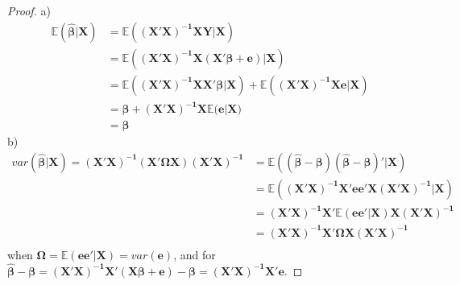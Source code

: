 \documentclass[12pt]{article}
\begin{document}
\begin{proof}
a) 
\begin{align*}
\mathbb{E}(\bm{\hat{\beta}}|\bm{X})
&=\mathbb{E}(\bm{(X'X)^{-1}XY}|\bm{X})\\
&=\mathbb{E}(\bm{(X'X)^{-1}X(X'\beta +e)}|\bm{X})\\
&=\mathbb{E}(\bm{(X'X)^{-1}XX'\beta}|\bm{X})+\mathbb{E}(\bm{(X'X)^{-1}Xe}|\bm{X})\\
&=\bm{\beta}+\bm{(X'X)^{-1}X\mathbb{E}(e}|\bm{X})\\
&=\bm{\beta}
\end{align*}
b)
\begin{align*}
var(\bm{\hat{\beta}}|\bm{X}) = \bm{(X'X)^{-1}(X'\Omega X)(X'X)^{-1}}
&=\mathbb{E}((\hat{\bm{\beta}}-\bm{\beta})(\hat{\bm{\beta}}-\bm{\beta})'|\bm{X})\\
&=\mathbb{E}(\bm{(X'X)^{-1}X'ee'X(X'X)^{-1}}|\bm{X})\\
&=\bm{(X'X)^{-1}X'}\mathbb{E}(\bm{ee'}|\bm{X})\bm{X(X'X)^{-1}}\\
&=\bm{(X'X)^{-1}X'}\bm{\Omega}\bm{X(X'X)^{-1}}\\
\end{align*}
when $\bm{\Omega} = \mathbb{E}(\bm{ee'}|\bm{X}) = var(\bm{e})$, and for $\bm{\hat{\beta}-\beta} = \bm{(X'X)^{-1}X'(X\beta +e)-\beta} =\bm{(X'X)^{-1}X'e}$.
\end{proof}
\end{document}
